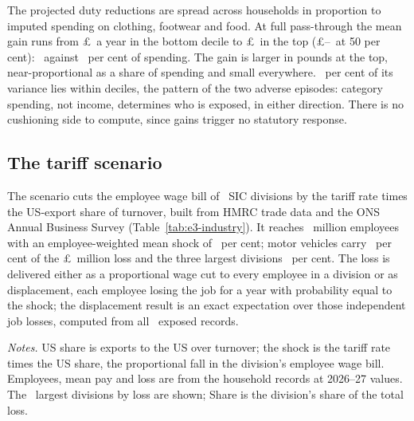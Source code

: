 The projected duty reductions are spread across households in
proportion to imputed spending on clothing, footwear and food. At full
pass-through the mean gain runs from \pounds\SsCetaSsGbpDecOne\ a year
in the bottom decile to \pounds\SsCetaSsGbpDecTen\ in the top
(\pounds\SsCetaSsGbpFiftyDecOne--\SsCetaSsGbpFiftyDecTen\ at 50 per
cent): \SsCetaSsPctSpendDecOne\ against \SsCetaSsPctSpendDecTen\ per
cent of spending. The gain is larger in pounds at the top,
near-proportional as a share of spending and small everywhere.
\SsCetaSsWithinPct\ per cent of its variance lies within deciles, the
pattern of the two adverse episodes: category spending, not income,
determines who is exposed, in either direction. There is no cushioning
side to compute, since gains trigger no statutory response.

\FloatBarrier
\subsection{The tariff scenario}\label{sec:results-tariff}

The scenario cuts the employee wage bill of
\EThreeIndDivisions\ SIC divisions by the tariff rate times the
US-export share of turnover, built from HMRC trade data and the ONS
Annual Business Survey \citep{hmrctrade, onsabs}
(Table~\ref{tab:e3-industry}). It reaches
\EThreeIndEmployeesM\ million employees with an employee-weighted mean
shock of \EThreeIndMeanShockPct\ per cent; motor vehicles carry
\EThreeIndTopLossSharePct\ per cent of the
\pounds\MsUSTariffGrossShockMillions\ million loss and the three
largest divisions \EThreeIndTopThreeLossSharePct\ per cent. The loss
is delivered either as a proportional wage cut to every employee in a
division or as displacement, each employee losing the job for a year
with probability equal to the shock; the displacement result is an
exact expectation over those independent job losses, computed from all
\EThreeDispExposedRecords\ exposed records.

\begin{table}[tbp]
\centering
\caption{Tariff scenario: exposure and earnings loss by industry}
\label{tab:e3-industry}

\begin{minipage}{.94\textwidth}\footnotesize
\emph{Notes.} US share is exports to the US over turnover; the shock
is the tariff rate times the US share, the proportional fall in the
division's employee wage bill. Employees, mean pay and loss are from
the household records at 2026--27 values. The \EThreeIndRowsShown\
largest divisions by loss are shown; Share is the division's share of
the total loss.
\end{minipage}
\end{table}

